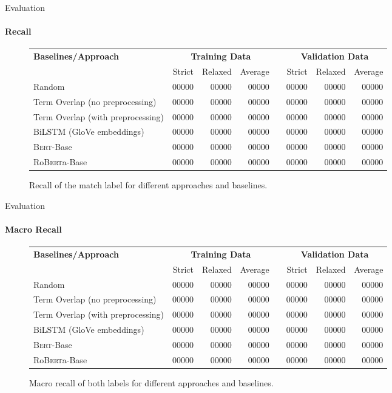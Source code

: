 \documentclass[english,handout]{mlutalk}
\newcommand{\Bert}{\textsc{Bert}\xspace}
\newcommand{\BertBase}{\Bert-Base\xspace}
\newcommand{\Roberta}{\mbox{Ro\textsc{Bert}a}\xspace}
\newcommand{\RobertaBase}{\Roberta-Base\xspace}
\begin{document}
\begin{frame}{Evaluation}
  \framesubtitle{Recall}
  \begin{figure}
    \centering
    \caption{Recall of the match label for different approaches and baselines.}
    \tiny
    \begin{tabular}{lrrrlrrr}
      \toprule
      \textbf{Baselines/Approach} & \multicolumn{3}{c}{\textbf{Training Data}} & & \multicolumn{3}{c}{\textbf{Validation Data}}\\ \cmidrule{2-4} \cmidrule{6-8}
        & Strict & Relaxed & Average & & Strict & Relaxed & Average\\
      \midrule
      Random 
      & 00000 & 00000 & 00000 & & 00000 & 00000 & 00000 \\
      Term Overlap (no preprocessing)
      & 00000 & 00000 & 00000 & & 00000 & 00000 & 00000 \\
      Term Overlap (with preprocessing)
      & 00000 & 00000 & 00000 & & 00000 & 00000 & 00000 \\
      \midrule
      BiLSTM (GloVe embeddings)
      & 00000 & 00000 & 00000 & & 00000 & 00000 & 00000 \\
      \BertBase
      & 00000 & 00000 & 00000 & & 00000 & 00000 & 00000 \\
      \RobertaBase
      & 00000 & 00000 & 00000 & & 00000 & 00000 & 00000 \\
      \bottomrule
    \end{tabular}
  \end{figure}
\end{frame}

\begin{frame}{Evaluation}
  \framesubtitle{Macro Recall}
  \begin{figure}
    \centering
    \caption{Macro recall of both labels for different approaches and baselines.}
    \tiny
    \begin{tabular}{lrrrlrrr}
      \toprule
      \textbf{Baselines/Approach} & \multicolumn{3}{c}{\textbf{Training Data}} & & \multicolumn{3}{c}{\textbf{Validation Data}}\\ \cmidrule{2-4} \cmidrule{6-8}
        & Strict & Relaxed & Average & & Strict & Relaxed & Average\\
      \midrule
      Random 
      & 00000 & 00000 & 00000 & & 00000 & 00000 & 00000 \\
      Term Overlap (no preprocessing)
      & 00000 & 00000 & 00000 & & 00000 & 00000 & 00000 \\
      Term Overlap (with preprocessing)
      & 00000 & 00000 & 00000 & & 00000 & 00000 & 00000 \\
      \midrule
      BiLSTM (GloVe embeddings)
      & 00000 & 00000 & 00000 & & 00000 & 00000 & 00000 \\
      \BertBase
      & 00000 & 00000 & 00000 & & 00000 & 00000 & 00000 \\
      \RobertaBase
      & 00000 & 00000 & 00000 & & 00000 & 00000 & 00000 \\
      \bottomrule
    \end{tabular}
  \end{figure}
\end{frame}
\end{document}
